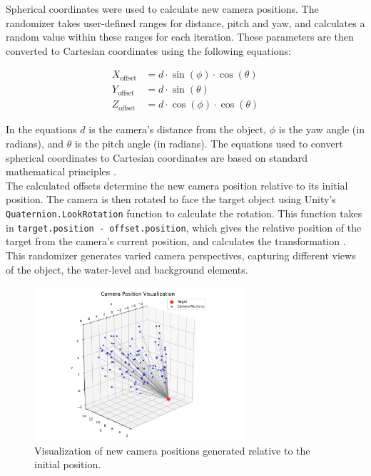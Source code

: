 \noindent Spherical coordinates were used to calculate new camera positions. The randomizer takes user-defined ranges for distance, pitch and yaw, and calculates a random value within these ranges for each iteration. These parameters are then converted to Cartesian coordinates using the following equations:

\begin{align}
X_{\text{offset}} &= d \cdot \sin(\phi) \cdot \cos(\theta) \\
Y_{\text{offset}} &= d \cdot \sin(\theta) \\
Z_{\text{offset}} &= d \cdot \cos(\phi) \cdot \cos(\theta)
\end{align}

\noindent In the equations \(d\) is the camera's distance from the object, \(\phi\) is the yaw angle (in radians), and \(\theta\) is the pitch angle (in radians). The equations used to convert spherical coordinates to Cartesian coordinates are based on standard mathematical principles \cite{wolfram_spherical_coordinates}.\\

\noindent The calculated offsets determine the new camera position relative to its initial position. The camera is then rotated to face the target object using Unity's \texttt{Quaternion.LookRotation} function to calculate the rotation. This function takes in \texttt{target.position - offset.position}, which gives the relative position of the target from the camera's current position, and calculates the transformation \cite{unity_quaternion_lookrotation}. This randomizer generates varied camera perspectives, capturing different views of the object, the water-level and background elements.

\begin{figure}[H]
    \centering
    \includegraphics[width=0.7\textwidth]{Figures/camerapos.png}
    \caption{Visualization of new camera positions generated relative to the initial position.}
    \label{fig:camera_randomizer_plot}
    
\end{figure}

